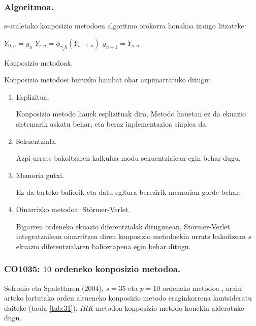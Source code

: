 \subsubsection*{Algoritmoa.}
s-ataletako konposizio metodoen algoritmo orokorra honakoa izango litzateke:

\begin{algorithm}[H]
 \BlankLine
  {
   \BlankLine
    $Y_{0,n}=y_{n} $\;
    \BlankLine
   {
    \BlankLine 
    $Y_{i,n}=\phi_{\gamma_i h}(Y_{i-1,n})$\;
   }
   \BlankLine
    $y_{n+1}=Y_{s,n}$\;
   \BlankLine
 }
 \caption{Konposizio metodoak.}
\end{algorithm}
 
Konposizio metodoei buruzko hainbat ohar azpimarratuko ditugu:
\begin{enumerate}
\item{Esplizitua.}

Konposizio metodo hauek esplizituak dira. Metodo hauetan ez da ekuazio sistemarik askatu behar, eta beraz inplementazioa sinplea da. 

\item{Sekuentziala.}

Azpi-urrats bakoitzaren kalkulua modu sekuentzialean egin behar dugu.

\item{Memoria gutxi.}

Ez da tarteko baliorik eta datu-egitura berezirik memorian gorde behar.   

\item{Oinarrizko metodoa: Störmer-Verlet.}

Bigarren ordeneko ekuazio diferentzialak ditugunean, Störmer-Verlet integratzailean oinarritzen diren konposizio metodoekin urrats bakoitzean $s$ ekuazio diferentzialaren balioztapena egin behar ditugu.

\end{enumerate}


\subsubsection*{CO1035: $10$ ordeneko konposizio metodoa.}

Sofronio eta Spalettaren ($2004$), $s=35$ eta $p=10$ ordeneko metodoa \cite{Sofroniou2005}, orain arteko lortutako orden altueneko konposizio metodo eraginkorrena kontsideratu daiteke (taula \ref{tab:31}). \emph{IRK} metodoa konposizio metodo honekin alderatuko dugu.     



